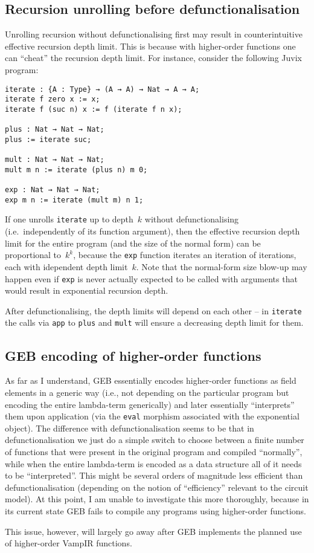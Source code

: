 \subsection{Recursion unrolling before defunctionalisation}

Unrolling recursion without defunctionalising first may result in
counterintuitive effective recursion depth limit. This is because with
higher-order functions one can ``cheat'' the recursion depth
limit. For instance, consider the following Juvix program:
\begin{verbatim}
iterate : {A : Type} → (A → A) → Nat → A → A;
iterate f zero x := x;
iterate f (suc n) x := f (iterate f n x);

plus : Nat → Nat → Nat;
plus := iterate suc;

mult : Nat → Nat → Nat;
mult m n := iterate (plus n) m 0;

exp : Nat → Nat → Nat;
exp m n := iterate (mult m) n 1;
\end{verbatim}
If one unrolls \texttt{iterate} up to depth~$k$ without
defunctionalising (i.e.~independently of its function argument), then
the effective recursion depth limit for the entire program (and the
size of the normal form) can be proportional to~$k^k$, because the
\texttt{exp} function iterates an iteration of iterations, each with
idependent depth limit~$k$. Note that the normal-form size blow-up may
happen even if \texttt{exp} is never actually expected to be called
with arguments that would result in exponential recursion depth.

After defunctionalising, the depth limits will depend on each other --
in \texttt{iterate} the calls via \texttt{app} to \texttt{plus} and
\texttt{mult} will ensure a decreasing depth limit for them.

\subsection{GEB encoding of higher-order functions}

As far as I understand, GEB essentially encodes higher-order functions
as field elements in a generic way (i.e., not depending on the
particular program but encoding the entire lambda-term generically)
and later essentially ``interprets'' them upon application (via the
\texttt{eval} morphism associated with the exponential object). The
difference with defunctionalisation seems to be that in
defunctionalisation we just do a simple switch to choose between a
finite number of functions that were present in the original program
and compiled ``normally'', while when the entire lambda-term is
encoded as a data structure all of it needs to be
``interpreted''. This might be several orders of magnitude less
efficient than defunctionalisation (depending on the notion of
``efficiency'' relevant to the circuit model). At this point, I am
unable to investigate this more thoroughly, because in its current
state GEB fails to compile any programs using higher-order functions.

This issue, however, will largely go away after GEB implements the
planned use of higher-order VampIR functions.

%


